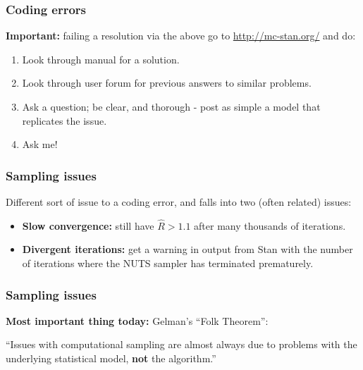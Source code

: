 \documentclass[handout]{beamer}
\begin{document}
\begin{frame}
	\frametitle{Coding errors}
	\textbf{Important:} failing a resolution via the above go to \url{http://mc-stan.org/} and do:
	
	\begin{enumerate}
		\item<3-> Look through manual for a solution.
		\item<4-> Look through user forum for previous answers to similar problems.
		\item<5-> Ask a question; be clear, and thorough - post as simple a model that replicates the issue.
		\item<6-> Ask me!
	\end{enumerate}
	
\end{frame}

\begin{frame}
\frametitle{Sampling issues}
 Different sort of issue to a coding error, and falls into two (often related) issues:

\begin{itemize}
	\item<3-> \textbf{Slow convergence:} still have $\hat{R}>1.1$ after many thousands of iterations.
	\item<4-> \textbf{Divergent iterations:} get a warning in output from Stan with the number of iterations where the NUTS sampler has terminated prematurely.
\end{itemize}

\end{frame}

\begin{frame}
	\frametitle{Sampling issues}
	\textbf{Most important thing today:} Gelman's ``Folk Theorem'':
	
	\vspace{0.2cm}
	
	``Issues with computational sampling are almost always due to problems with the underlying statistical model, \textbf{not} the algorithm.''
	
\end{frame}
\end{document}

